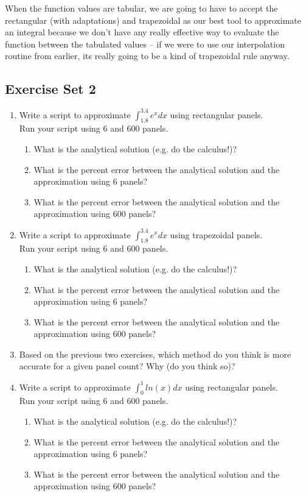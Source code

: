 When the function values are tabular, we are going to have to accept the rectangular (with adaptations) and trapezoidal as our best tool to approximate an integral because we don't have any really effective way to evaluate the function between the tabulated values --  if we were to use our interpolation routine from earlier, its really going to be a kind of trapezoidal rule anyway.

\clearpage
\subsection{Exercise Set 2}
\begin{enumerate}
\item Write a script to approximate $\int_{1.8}^{3.4}e^x dx$ using rectangular panels.  \\Run your script using 6 and 600 panels.  
\begin{enumerate}
\item What is the analytical solution (e.g. do the calculus!)?  
\item What is the percent error between the analytical solution and the approximation using 6 panels?
\item What is the percent error between the analytical solution and the approximation using 600 panels?
\end{enumerate}
\item Write a script to approximate $\int_{1.8}^{3.4}e^x dx$ using trapezoidal panels.   \\Run your script using 6 and 600 panels.  
\begin{enumerate}
\item What is the analytical solution (e.g. do the calculus!)?  
\item What is the percent error between the analytical solution and the approximation using 6 panels?
\item What is the percent error between the analytical solution and the approximation using 600 panels?
\end{enumerate}
\item Based on the previous two exercises, which method do you think is more accurate for a given panel count?  Why (do you think so)?
\item Write a script to approximate $\int_{0}^{1}ln(x) dx$ using rectangular panels.  \\Run your script using 6 and 600 panels.  
\begin{enumerate}
\item What is the analytical solution (e.g. do the calculus!)?  
\item What is the percent error between the analytical solution and the approximation using 6 panels?
\item What is the percent error between the analytical solution and the approximation using 600 panels?
\end{enumerate}


\end{enumerate}
